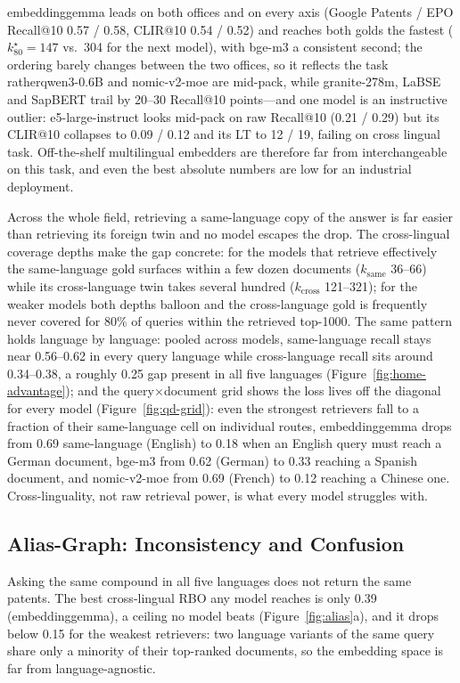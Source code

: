embeddinggemma leads on both offices and on every axis (Google Patents / EPO
Recall@10 0.57 / 0.58, CLIR@10 0.54 / 0.52) and reaches both golds the fastest
($k^\star_{80}{=}147$ vs.\ 304 for the next model), with bge-m3 a consistent second;
the ordering barely changes between the two offices, so it reflects the task ratherqwen3-0.6B and
nomic-v2-moe are mid-pack, while granite-278m, LaBSE and SapBERT trail by 20--30
Recall@10 points---and one model is an instructive outlier: e5-large-instruct looks
mid-pack on raw Recall@10 (0.21 / 0.29) but its CLIR@10 collapses to 0.09 / 0.12 and
its LT to 12 / 19, failing on cross lingual task. Off-the-shelf multilingual embedders are
therefore far from interchangeable on this task, and even the best absolute numbers
are low for an industrial deployment.


Across the whole field, retrieving a same-language copy of the answer is far easier
than retrieving its foreign twin and no model escapes the drop. The cross-lingual
coverage depths make the gap concrete: for the models that retrieve effectively the
same-language gold surfaces within a few dozen documents ($k_{\mathrm{same}}$
36--66) while its cross-language twin takes several hundred ($k_{\mathrm{cross}}$
121--321); for the weaker models both depths balloon and the cross-language gold is
frequently never covered for $80\%$ of queries within the retrieved top-1000. The
same pattern holds language by language: pooled across models, same-language recall
stays near 0.56--0.62 in every query language while cross-language recall sits around
0.34--0.38, a roughly 0.25 gap present in all five languages
(Figure~\ref{fig:home-advantage}); and the query$\times$document grid shows the loss lives off the diagonal for every
model (Figure~\ref{fig:qd-grid}): even the strongest retrievers fall to a fraction
of their same-language cell on individual routes, embeddinggemma drops from 0.69
same-language (English) to 0.18 when an English query must reach a German document,
bge-m3 from 0.62 (German) to 0.33 reaching a Spanish document, and nomic-v2-moe from
0.69 (French) to 0.12 reaching a Chinese one. Cross-linguality, not raw retrieval
power, is what every model struggles with.

\subsection{Alias-Graph: Inconsistency and Confusion}
\label{ssec:alias}

Asking the same compound in all five languages does not return the same patents.
The best cross-lingual RBO any model reaches is only 0.39 (embeddinggemma), a
ceiling no model beats (Figure~\ref{fig:alias}a), and it drops below 0.15 for the
weakest retrievers: two language variants of the same query share only a minority
of their top-ranked documents, so the embedding space is far from language-agnostic.


